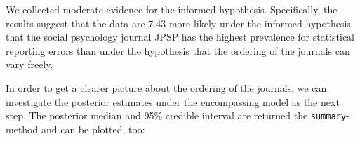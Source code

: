 \documentclass[
  english,
  man,floatsintext]{apa6}
\newenvironment{Shaded}{\begin{snugshade}}{\end{snugshade}}
\newcommand{\CommentTok}[1]{\textcolor[rgb]{0.56,0.35,0.01}{\textit{#1}}}
\newcommand{\DataTypeTok}[1]{\textcolor[rgb]{0.13,0.29,0.53}{#1}}
\newcommand{\DecValTok}[1]{\textcolor[rgb]{0.00,0.00,0.81}{#1}}
\newcommand{\KeywordTok}[1]{\textcolor[rgb]{0.13,0.29,0.53}{\textbf{#1}}}
\newcommand{\NormalTok}[1]{#1}
\newcommand{\OperatorTok}[1]{\textcolor[rgb]{0.81,0.36,0.00}{\textbf{#1}}}
\newcommand{\StringTok}[1]{\textcolor[rgb]{0.31,0.60,0.02}{#1}}
\begin{document}
\begin{Shaded}
\end{Shaded}

We collected moderate evidence for the informed
hypothesis. Specifically, the results suggest that the data
are 7.43 more likely under
the informed hypothesis that the social psychology journal JPSP
has the highest prevalence for statistical reporting errors than under the hypothesis that the ordering
of the journals can vary freely.

\begin{Shaded}
\end{Shaded}

In order to get a clearer picture about the ordering of the journals, we can investigate the posterior estimates
under the encompassing model as the next step. The posterior median and 95\% credible interval are returned the \texttt{summary}-method and can be plotted, too:
\end{document}
